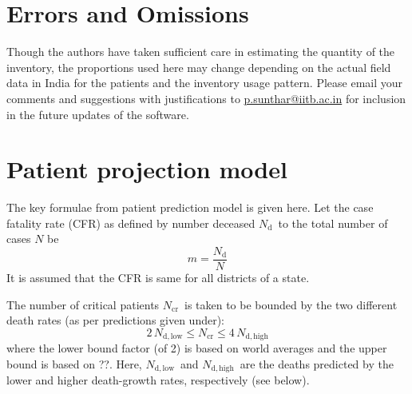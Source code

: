 \documentclass{article}
\newcommand{\email}[1]{\href{mailto:#1}{#1}}
\newcommand{\nd}{\ensuremath{N_{\mathrm{d}}}}
\newcommand{\ndl}{\ensuremath{N_{\mathrm{d,low}}}}
\newcommand{\ndh}{\ensuremath{N_{\mathrm{d,high}}}}
\newcommand{\ncr}{\ensuremath{N_{\mathrm{cr}}}}
\begin{document}
\section{Errors and Omissions}
Though the authors have taken sufficient care in estimating the
quantity of the inventory, the proportions used here may change
depending on the actual field data in India for the patients and the
inventory usage pattern.  Please email your comments and suggestions
with justifications to \email{p.sunthar@iitb.ac.in} for inclusion in the
future updates of the software.

\appendix
\section{Patient projection model}
The key formulae from patient prediction model \cite{ansualok20} is
given here. Let the case fatality rate (CFR) as defined by number
deceased \nd\ to
the total number of cases $N$ be
\begin{equation}
  m = \frac{\nd}{N}
\end{equation}
It is assumed that the CFR is same for all districts of a state.


The number of critical patients \ncr\ is taken to be bounded by the
two different death rates (as per predictions given under):
\begin{equation}
  2 \, \ndl \leq \ncr \leq 4 \, \ndh
\end{equation}
where the lower bound factor (of 2) is based on world averages\cite{who19mar} and
the upper bound is based on ??. Here, \ndl\ and \ndh\ are the deaths predicted by
the lower and higher death-growth rates, respectively (see below). 
\end{document}
